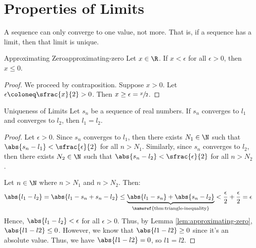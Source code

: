 \section{Properties of Limits}

A sequence can only converge to one value, not more. That is, if a sequence has a limit, then that limit is unique.

\begin{lembox}{Approximating Zero}{approximating-zero}
    Let $x \in \R$. If $x < \epsilon$ for all $\epsilon > 0$, then $x \leq 0$.
    \tcblower
    \begin{proof}
        We proceed by contraposition. Suppose $x > 0$. Let $\epsilon \coloneq \sfrac{x}{2} > 0$. Then $x \geq \epsilon = \sfrac{x}{2}$.
    \end{proof}
\end{lembox}

\begin{thmbox}{Uniqueness of Limits}{}
    Let $s_n$ be a sequence of real numbers. If $s_n$ converges to $l_1$ and converges to $l_2$, then $l_1 = l_2$.
    \tcblower
    \begin{proof}
        Let $\epsilon > 0$. Since $s_n$ converges to $l_1$, then there exists $N_1 \in \N$ such that $\abs{s_n - l_1} < \sfrac{\epsilon}{2}$ for all $n > N_1$. Similarly, since $s_n$ converges to $l_2$, then there exists $N_2 \in \N$ such that $\abs{s_n - l_2} < \sfrac{\epsilon}{2}$ for all $n > N_2$.

        Let $n \in \N$ where $n > N_1$ and $n > N_2$. Then:
        \[ \abs{l_1 - l_2} = \abs{l_1 - s_n + s_n - l_2} \leq \underbrace{\abs{l_1 - s_n} + \abs{s_n - l_2}}_\text{\nameref{thm:triangle-inequality}} < {\frac{\epsilon}{2} + \frac{\epsilon}{2}} = \epsilon \]
        Hence, $\abs{l_1 - l_2} < \epsilon$ for all $\epsilon > 0$. Thus, by Lemma \ref{lem:approximating-zero}, $\abs{l1-l2} \leq 0$. However, we know that $\abs{l1-l2} \geq 0$ since it's an absolute value. Thus, we have $\abs{l1-l2} = 0$, so $l1 = l2$.
    \end{proof}
\end{thmbox}



